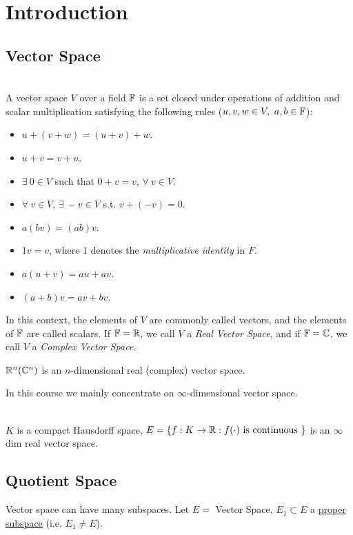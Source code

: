 \section{Introduction}
\subsection{Vector Space}
\begin{definition}\ \\
A vector space $V$ over a field $\mathbb{F}$ is a set closed under operations of addition and scalar multiplication satisfying the following rules ($u,v,w \in V,\ a,b \in \mathbb{F}$):
\begin{itemize}
    \item $u + (v+w) = (u+v)+w$.
    \item $u + v = v + u$.
    \item $\exists\ 0 \in V$ such that $ 0 + v = v$, $\forall\ v \in V$.
    \item $\forall\ v \in V$, $\exists\ -v \in V$ s.t. $v + (-v) = 0$.
    \item $a(bv) = (ab)v$.
    \item $1 v = v$, where $1$ denotes the \textit{multiplicative identity} in $F$.
    \item $a(u+v) = au + av$.
    \item $(a+b)v = av + bv$.
\end{itemize}
In this context, the elements of $V$ are commonly called vectors, and the elements of $\mathbb{F}$ are called scalars. If $\mathbb{F} = \mathbb{R}$, we call $V$ a \textit{Real Vector Space}, and if $\mathbb{F} = \mathbb{C}$, we call $V$ a \textit{Complex Vector Space}.
\end{definition}
\begin{example}
$\mathbb{R}^n (\mathbb{C}^n)$ is an $n$-dimensional real (complex) vector space.
\end{example}

\np In this course we mainly concentrate on $\infty$-dimensional vector space.

\begin{example}\ \\
$K$ is a compact Hausdorff space, $E = \{f: K \to \mathbb{R}: f(\cdot) \text{ is continuous }\}$ is an $\infty$ dim real vector space.
\end{example}


\vspace{6pt}
\subsection{Quotient Space}
\noindent Vector space can have many subspaces. Let $E = $ Vector Space, $E_1 \subset E$ a \underline{proper subspace} (i.e. $E_1 \neq E$).

